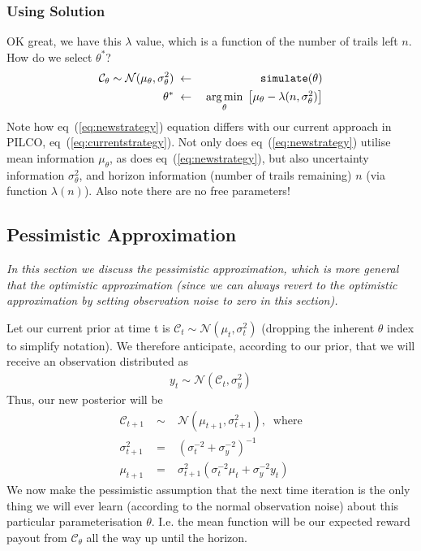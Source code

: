 \documentclass[a4paper,10pt]{article}
\newcommand{\argmin}[1]{\underset{#1}{\operatorname{arg}\operatorname{min}}\;}
\newcommand{\sqb}[1]{\begin{bmatrix}#1\end{bmatrix}}
\newcommand{\C}{\mathcal{C}}
\newcommand{\N}{\mathcal{N}}
\newcommand{\inv}{^{-1}}
\begin{document}
\subsubsection{Using Solution}

OK great, we have this $\lambda$ value, which is a function of the number of 
trails left $n$. How do we select $\theta^*$?
%
\begin{eqnarray}
 \C_\theta \sim \N(\mu_\theta,\sigma^2_\theta)&\;\leftarrow\;&{\tt 
simulate}(\theta) \\ 
 \theta^* &\;\leftarrow\;& \argmin{\theta} \sqb{\mu_\theta - 
\lambda(n,\sigma^2_\theta)} \label{eq:newstrategy}
\end{eqnarray}
%
Note how eq~(\ref{eq:newstrategy}) equation differs with our current 
approach in PILCO, eq~(\ref{eq:currentstrategy}). Not only does 
eq~(\ref{eq:newstrategy}) utilise mean information $\mu_\theta$, as 
does eq~(\ref{eq:newstrategy}), but also uncertainty information 
$\sigma^2_\theta$, and horizon information (number of trails remaining) $n$ 
(via function $\lambda(n)$). Also note there are no free parameters!

\subsection{Pessimistic Approximation} \label{sec:soln-pessimism}

\textit{In this section we discuss the pessimistic approximation,
which is more general that the optimistic approximation
(since we can always revert to the optimistic approximation by setting observation noise to zero in this section).}

Let our current prior at time t is $\C_t \sim \N(\mu_t,\sigma^2_t)$
(dropping the inherent $\theta$ index to simplify notation).
We therefore anticipate, according to our prior, that we will receive an observation distributed as
\begin{eqnarray}
 y_t \sim \N(\C_t,\sigma_y^2)
\end{eqnarray}
%
Thus, our new posterior will be
\begin{eqnarray}
 \C_{t+1} &\;\sim\;& \N(\mu_{t+1},\sigma^2_{t+1}), \;\; \text{where} \\
 \sigma^2_{t+1} &\;=\;& (\sigma^{-2}_t + \sigma_y^{-2})\inv \label{eq:sigma-new} \\
 \mu_{t+1} &\;=\;& \sigma^2_{t+1}(\sigma^{-2}_t\mu_t + \sigma_y^{-2}y_t)
\end{eqnarray}
We now make the pessimistic assumption that the next time iteration is the only thing 
we will ever learn (according to the normal observation noise) about this particular parameterisation $\theta$. 
I.e. the mean function will be our expected reward payout from $\C_\theta$ all the way up until the horizon.
\end{document}
